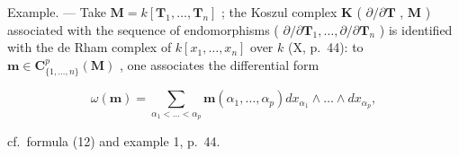 Example. --- Take \(\mathbf{M} = k[\mathbf{T}_1, \ldots, \mathbf{T}_n]\) ; the Koszul complex \(\mathbf{K}\) ( \(\partial/\partial\mathbf{T}\) , \(\mathbf{M}\) ) associated with the sequence of endomorphisms ( \(\partial/\partial\mathbf{T}_1, \ldots, \partial/\partial\mathbf{T}_n\) ) is identified with the de Rham complex of \(k[x_{1},\ldots,x_{n}]\) over \(k\) (X, p.~44): to \(\boldsymbol{m}\in\mathbf{C}_{\{1,\ldots,n\}}^{p}(\mathbf{M})\) , one associates the differential form

\[
\omega (\boldsymbol {m}) = \sum_ {\alpha_ {1} <   \dots <   \alpha_ {p}} \boldsymbol {m} \left(\alpha_ {1}, \dots , \alpha_ {p}\right) d x _ {\alpha_ {1}} \wedge \dots \wedge d x _ {\alpha_ {p}},
\]

cf.~formula (12) and example 1, p.~44.

